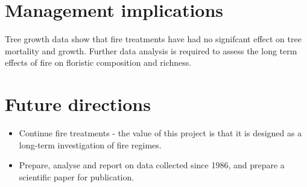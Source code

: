 \documentclass[version=last, paper=a4, DIV=18, usenames, dvipsnames]{scrartcl}
\begin{document}
\section{Management implications}



Tree growth data show that fire treatments have had no signifcant effect on tree mortality and growth. Further data analysis is required to assess the long term effects of fire on floristic composition and richness.






\section{Future directions}



\begin{itemize}

  \item Continue fire treatments - the value of this project is that it is designed as a long-term investigation of fire regimes.

  \item Prepare, analyse and report on data collected since 1986, and prepare a scientific paper for publication.

\end{itemize}






\clearpage
\end{document}
